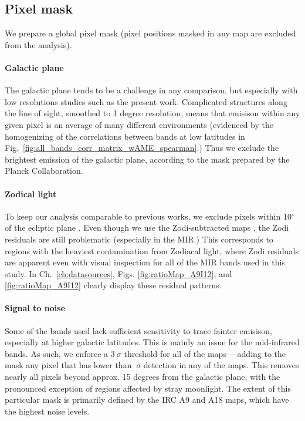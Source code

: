      \subsection{Pixel mask}
          We prepare a global pixel mask (pixel positions masked in any map are excluded from the analysis).

        \paragraph{Galactic plane}
          The galactic plane tends to be a challenge in any comparison, but especially with low resolutions studies such as the present work. Complicated structures along the line of sight, smoothed to 1 degree resolution, means that emisison within any given pixel is an average of many different environments (evidenced by the homogenizing of the correlations between bands at low latitudes in Fig.~\ref{fig:all_bands_corr_matrix_wAME_spearman}.) Thus we exclude the brightest emission of the galactic plane, according to the mask prepared by the Planck Collaboration.

        \paragraph{Zodical light}
          To keep our analysis comparable to previous works, we exclude pixels within 10$^{\circ}$ of the ecliptic plane \citep{hensley16}.  Even though we use the Zodi-subtracted maps \citep{kelsall98, kondo16, ootsubo16}, the Zodi residuals are still problematic (especially in the MIR.) This corresponds to regions with the heaviest contamination from Zodiacal light, where Zodi residuals are apparent even with visual inspection for all of the MIR bands used in this study. In Ch.~\ref{ch:datasources}, Figs. \ref{fig:ratioMap_A9I12}, and \ref{fig:ratioMap_A9I12} clearly display these residual patterns.

        \paragraph{Signal to noise}
          Some of the bands used lack sufficient sensitivity to trace fainter emisison, especially at higher galactic latitudes. This is mainly an issue for the mid-infrared bands. As such, we enforce a $3~\sigma$ threshold for all of the maps--- adding to the mask any pixel that has lower than $~\sigma$ detection in any of the maps. This removes nearly all pixels beyond approx. 15 degrees from the galactic plane, with the pronounced exception of regions affected by stray moonlight. The extent of this particular mask is primarily defined by the IRC A9 and A18 maps, which have the highest noise levels.

